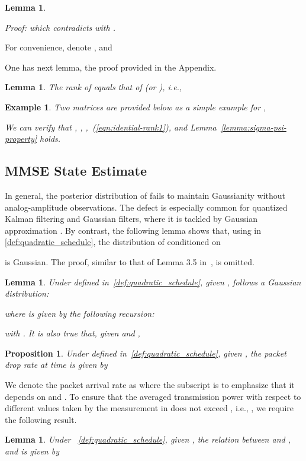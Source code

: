 \documentclass[twocolumn]{autart}    \usepackage{cite}
\newtheorem{lemma}[theorem]{Lemma}
\newtheorem{proposition}[theorem]{Proposition}
\newtheorem{example}[theorem]{Example}
\begin{document}
{{\begin{lemma}
\begin{pf*}{Proof:}
which contradicts with .
\end{pf*}
\end{lemma}
For convenience, denote
,  and

One has next lemma, the proof provided in the Appendix.
\begin{lemma}\label{lemma:rank-Phi}
The rank of  equals that of  (or ), i.e.,

\end{lemma}
\begin{example}
Two matrices are provided below
as a simple example for ,

We can verify that , ,
,~(\ref{eqn:idential-rank1}), and Lemma~\ref{lemma:sigma-psi-property} holds.
\end{example}












\subsection{MMSE State Estimate}\label{subsec:bayesian-reference-power-schedule}

In general, the posterior distribution of  fails to maintain Gaussianity without
analog-amplitude observations. The defect is
especially common for quantized Kalman filtering and Gaussian filters, where
it is tackled by Gaussian approximation \cite{andmoo79,kotecha2003gaussian,soi-kf-tsp06}.
By contrast,
the following lemma shows that,
using  in \eqref{def:quadratic_schedule},
the distribution of  conditioned on

is Gaussian. The proof, similar to that of Lemma 3.5 in~\cite{Liyuzhe13CDC}, is omitted.
\begin{lemma} \label{lemma:still-gaussian}
Under  defined in~\eqref{def:quadratic_schedule}, given ,
 follows a Gaussian distribution:

where  is given by the following recursion:

with . It is also true that, given
 and ,

\end{lemma}
\begin{proposition} \label{lemma:communication_rate}
Under  defined in~\eqref{def:quadratic_schedule}, given ,
the packet drop rate at time  is given by 
\end{proposition}
We denote the packet arrival rate
as  where
the subscript  is to
emphasize that it depends on  and .
To ensure that the averaged transmission power with respect to different values
taken by the measurement in  does not exceed
, i.e.,
, we require the following result.
\begin{lemma} \label{lemma:energy beta}
Under ~\eqref{def:quadratic_schedule}, given , the relation between  and , and  is given by


\end{lemma}}}
\end{document}
